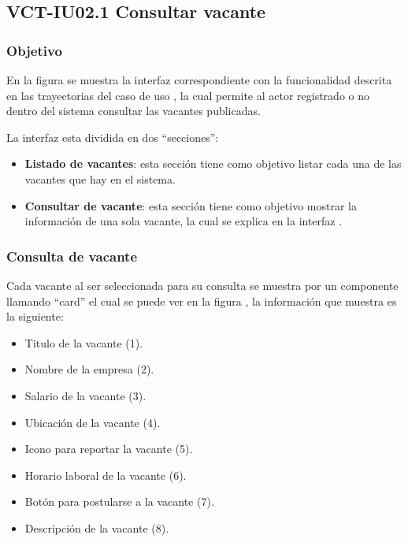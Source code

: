 \clearpage
\subsection{VCT-IU02.1 Consultar vacante}

\subsubsection{Objetivo}
En la figura  se muestra la interfaz correspondiente con la funcionalidad descrita en las
trayectorias del caso de uso  , la cual permite al actor registrado o no dentro del sistema consultar 
las vacantes publicadas.

La interfaz esta dividida en dos ``secciones'':
\begin{itemize}
   \item \textbf{Listado de vacantes}: esta sección tiene como objetivo listar cada una de las vacantes que hay en el sistema.
   \item \textbf{Consultar de vacante}: esta sección tiene como objetivo mostrar la información de una sola vacante, la cual se explica en 
   la interfaz .
\end{itemize}


\subsubsection{Consulta de vacante}
Cada vacante al ser seleccionada para su consulta se muestra por un componente llamando ``card'' el cual se puede ver en la figura , la información que 
muestra es la siguiente: 
\begin{itemize}
   \item Titulo de la vacante (1).
   \item Nombre de la empresa (2).
   \item Salario de la vacante (3).
   \item Ubicación de la vacante (4).
   \item Icono para reportar la vacante (5).
   \item Horario laboral de la vacante (6).
   \item Botón para postularse a la vacante (7).
   \item Descripción de la vacante (8).
\end{itemize}




\clearpage

